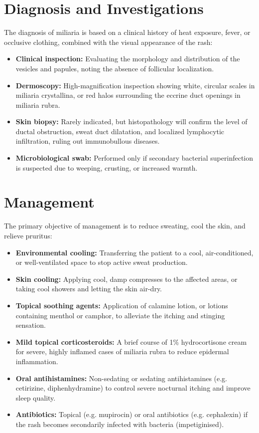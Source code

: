 \section*{Diagnosis and Investigations}
The diagnosis of miliaria is based on a clinical history of heat exposure, fever, or occlusive clothing, combined with the visual appearance of the rash:
\begin{itemize}
    \item \textbf{Clinical inspection:} Evaluating the morphology and distribution of the vesicles and papules, noting the absence of follicular localization.
    \item \textbf{Dermoscopy:} High-magnification inspection showing white, circular scales in miliaria crystallina, or red halos surrounding the eccrine duct openings in miliaria rubra.
    \item \textbf{Skin biopsy:} Rarely indicated, but histopathology will confirm the level of ductal obstruction, sweat duct dilatation, and localized lymphocytic infiltration, ruling out immunobullous diseases.
    \item \textbf{Microbiological swab:} Performed only if secondary bacterial superinfection is suspected due to weeping, crusting, or increased warmth.
\end{itemize}

\section*{Management}
The primary objective of management is to reduce sweating, cool the skin, and relieve pruritus:
\begin{itemize}
    \item \textbf{Environmental cooling:} Transferring the patient to a cool, air-conditioned, or well-ventilated space to stop active sweat production.
    \item \textbf{Skin cooling:} Applying cool, damp compresses to the affected areas, or taking cool showers and letting the skin air-dry.
    \item \textbf{Topical soothing agents:} Application of calamine lotion, or lotions containing menthol or camphor, to alleviate the itching and stinging sensation.
    \item \textbf{Mild topical corticosteroids:} A brief course of 1\% hydrocortisone cream for severe, highly inflamed cases of miliaria rubra to reduce epidermal inflammation.
    \item \textbf{Oral antihistamines:} Non-sedating or sedating antihistamines (e.g. cetirizine, diphenhydramine) to control severe nocturnal itching and improve sleep quality.
    \item \textbf{Antibiotics:} Topical (e.g. mupirocin) or oral antibiotics (e.g. cephalexin) if the rash becomes secondarily infected with bacteria (impetiginised).
\end{itemize}

